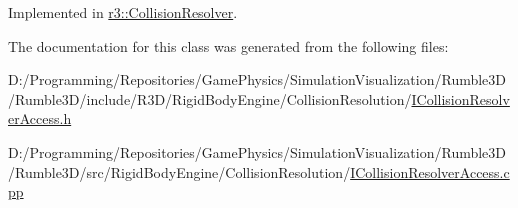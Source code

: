 Implemented in \mbox{\hyperlink{classr3_1_1_collision_resolver_a134da5221d60b34c568f7de29c9d0a58}{r3\+::\+Collision\+Resolver}}.



The documentation for this class was generated from the following files\+:\begin{DoxyCompactItemize}
\item 
D\+:/\+Programming/\+Repositories/\+Game\+Physics/\+Simulation\+Visualization/\+Rumble3\+D/\+Rumble3\+D/include/\+R3\+D/\+Rigid\+Body\+Engine/\+Collision\+Resolution/\mbox{\hyperlink{_i_collision_resolver_access_8h}{I\+Collision\+Resolver\+Access.\+h}}\item 
D\+:/\+Programming/\+Repositories/\+Game\+Physics/\+Simulation\+Visualization/\+Rumble3\+D/\+Rumble3\+D/src/\+Rigid\+Body\+Engine/\+Collision\+Resolution/\mbox{\hyperlink{_i_collision_resolver_access_8cpp}{I\+Collision\+Resolver\+Access.\+cpp}}\end{DoxyCompactItemize}
